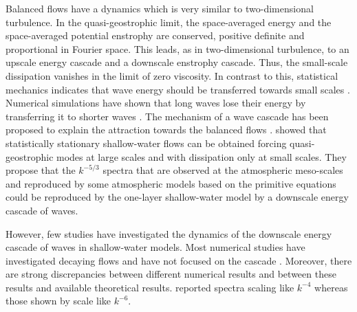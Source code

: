 \documentclass{jfm}
\newcommand{\Add}[1]{{\color{blue}#1}}
\begin{document}
Balanced flows have a dynamics which is very similar to
two-dimensional turbulence.
%
In the quasi-geostrophic limit, the space-averaged energy and the
space-averaged potential enstrophy are conserved, positive definite
and proportional in Fourier space. This leads\Add{, as in
two-dimensional turbulence,} to an upscale energy cascade and a
downscale enstrophy cascade.
%
Thus, the small-scale dissipation vanishes in the limit of zero
viscosity.
%
In contrast to this, statistical mechanics indicates that wave energy
should be transferred towards small scales \cite[]{Warn1986}.
Numerical simulations have shown that long waves lose their energy by
transferring it to shorter waves \cite[]{Sadourny1975,
FargeSadourny1989, YuanHamilton1994}.  The mechanism of a wave cascade
has been proposed to explain the attraction towards the balanced flows
\cite[]{Sadourny1975}.  \cite{YuanHamilton1994} showed that
statistically stationary shallow-water flows can be obtained forcing
quasi-geostrophic modes at large scales and with dissipation only at
small scales.
%
\Add{They propose that the $k^{-5/3}$ spectra that are observed at the
atmospheric meso-scales} \cite[]{NastromGage1985, FrehlichSharman2010}
\Add{and reproduced by some atmospheric models based on the primitive
equations} \cite[]{KoshykHamilton2001, Skamarock2004,
Hamilton_etal2008} \Add{could be reproduced by the one-layer
shallow-water model by a downscale energy cascade of waves.}



However, few studies have investigated the dynamics of the downscale
energy cascade of waves in shallow-water models.
%
Most numerical studies have investigated decaying flows and have not
focused on the cascade \cite[]{FargeSadourny1989,
LarichevMcWilliams1991, SpallMcWilliams1992,
PolvaniMcWilliamsSpallFord1994, LahayeZeitlin2012}.
%
Moreover, there are strong discrepancies between different numerical
results and between these results and available theoretical results.
%
\cite{FargeSadourny1989} reported spectra scaling like $k^{-4}$
whereas those shown by \cite{LahayeZeitlin2012} scale like $k^{-6}$.
\end{document}
